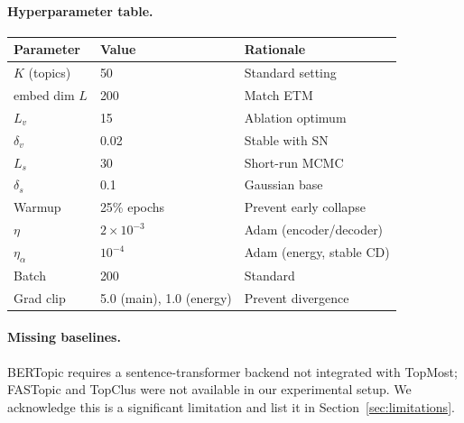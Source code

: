 \documentclass[10pt]{article}
\begin{document}
\paragraph{Hyperparameter table.}
\begin{center}
\small
\begin{tabular}{lll}
\hline
Parameter & Value & Rationale \\
\hline
$K$ (topics) & 50 & Standard setting \\
embed dim $L$ & 200 & Match ETM \citep{dieng2020} \\
$L_v$ & 15 & Ablation optimum \\
$\delta_v$ & 0.02 & Stable with SN \\
$L_s$ & 30 & Short-run MCMC \citep{nijkamp2019shortrun} \\
$\delta_s$ & 0.1 & Gaussian base \\
Warmup & 25\% epochs & Prevent early collapse \\
$\eta$ & $2\times10^{-3}$ & Adam (encoder/decoder) \\
$\eta_\alpha$ & $10^{-4}$ & Adam (energy, stable CD) \\
Batch & 200 & Standard \\
Grad clip & 5.0 (main), 1.0 (energy) & Prevent divergence \\
\hline
\end{tabular}
\end{center}

\paragraph{Missing baselines.}
BERTopic \citep{grootendorst2022} requires a sentence-transformer backend not
integrated with TopMost; FASTopic \citep{wu2024fastopic} and TopClus
\citep{meng2022topclus} were not available in our experimental setup.
We acknowledge this is a significant limitation and list it in Section~\ref{sec:limitations}.
\end{document}
